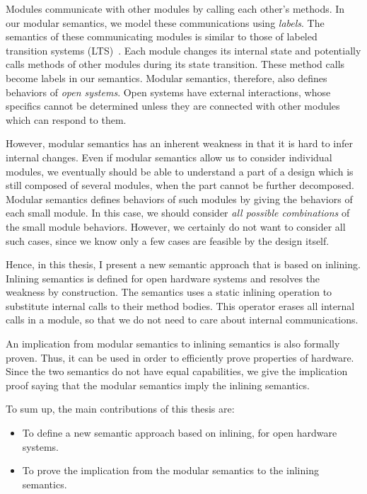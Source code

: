 Modules communicate with other modules by calling each other's
methods. In our modular semantics, we model these communications using
\emph{labels}. The semantics of these communicating modules is similar
to those of labeled transition systems (LTS)~\cite{lts}. Each module
changes its internal state and potentially calls methods of other
modules during its state transition. These method calls become labels
in our semantics. Modular semantics, therefore, also defines behaviors
of \emph{open systems}. Open systems have external interactions, whose
specifics cannot be determined unless they are connected with other
modules which can respond to them.

However, modular semantics has an inherent weakness in that it is hard
to infer internal changes. Even if modular semantics allow us to
consider individual modules, we eventually should be able to
understand a part of a design which is still composed of several
modules, when the part cannot be further decomposed. Modular semantics
defines behaviors of such modules by giving the behaviors of each
small module. In this case, we should consider \emph{all possible
  combinations} of the small module behaviors. However, we certainly
do not want to consider all such cases, since we know only a few cases
are feasible by the design itself.

Hence, in this thesis, I present a new semantic approach that is based
on inlining. Inlining semantics is defined for open hardware systems
and resolves the weakness by construction. The semantics uses a static
inlining operation to substitute internal calls to their method
bodies. This operator erases all internal calls in a module, so that
we do not need to care about internal communications.

An implication from modular semantics to inlining semantics is also
formally proven. Thus, it can be used in order to efficiently prove
properties of hardware. Since the two semantics do not have equal
capabilities, we give the implication proof saying that the modular
semantics imply the inlining semantics.

To sum up, the main contributions of this thesis are:
\begin{itemize}
\item To define a new semantic approach based on inlining, for open
  hardware systems.
\item To prove the implication from the modular semantics to the
  inlining semantics.
\end{itemize}

